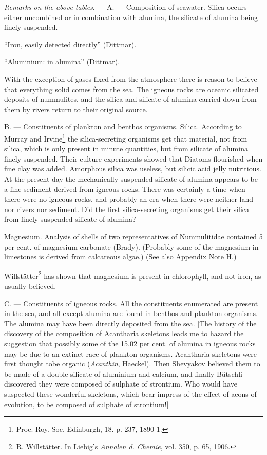 \documentclass[a4paper, 12pt, oneside, landscape]{article}
\begin{document}
\emph{Remarks on the above tables}. --- A. --- Composition of seawater. Silica occurs either uncombined or in combination with alumina, the silicate of alumina being finely suspended.

``Iron, easily detected directly'' (Dittmar).

``Aluminium: in alumina'' (Dittmar).

With the exception of gases fixed from the atmosphere there is reason to believe that everything solid comes from the sea. The igneous rocks are oceanic silicated deposits of nummulites, and the silica and silicate of alumina carried down from them by rivers return to their original source.

B. --- Constituents of plankton and benthos organisms. Silica. According to Murray and Irvine\footnote{Proc. Roy. Soc. Edinburgh, 18. p. 237, 1890-1.} the silica-secreting organisms get that material, not from silica, which is only present in minute quantities, but from silicate of alumina finely suspended. Their culture-experiments showed that Diatoms flourished when fine clay was added. Amorphous silica was useless, but silicic acid jelly nutritious. At the present day the mechanically suspended silicate of alumina appears to be a fine sediment derived from igneous rocks. There was certainly a time when there were no igneous rocks, and probably an era when there were neither land nor rivers nor sediment. Did the first silica-secreting organisms get their silica from finely suspended silicate of alumina?

Magnesium. Analysis of shells of two representatives of Nummulitidae contained 5 per cent. of magnesium carbonate (Brady). (Probably some of the magnesium in limestones is derived from calcareous algae.) (See also Appendix Note H.)

Willstätter\footnote{R. Willstätter. In Liebig's \emph{Annalen d. Chemie}, vol. 350, p. 65, 1906.} has shown that magnesium is present in chlorophyll, and not iron, as usually believed.

C. --- Constituents of igneous rocks. All the constituents enumerated are present in the sea, and all except alumina are found in benthos and plankton organisms. The alumina may have been directly deposited from the sea. [The history of the discovery of the composition of Acantharia skeletons leads me to hazard the suggestion that possibly some of the 15.02 per cent. of alumina in igneous rocks may be due to an extinct race of plankton organisms. Acantharia skeletons were first thought tobe organic (\emph{Acanthin}, Haeckel). Then Shevyakov believed them to be made of a double silicate of aluminium and calcium, and finally Bütschli discovered they were composed of sulphate of strontium. Who would have suspected these wonderful skeletons, which bear impress of the effect of aeons of evolution, to be composed of sulphate of strontium!]
\end{document}

